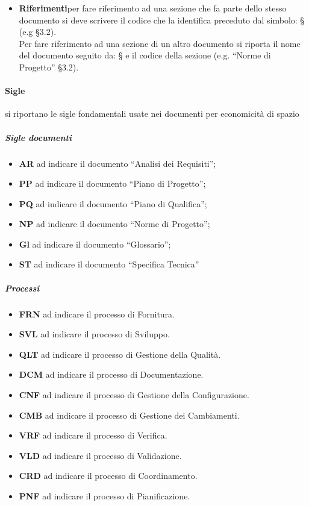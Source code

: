 \begin{itemize}
\begin{itemize}
							\item\textbf{Riferimenti}per fare riferimento ad una sezione che fa parte dello stesso documento si deve scrivere il codice che la identifica preceduto dal simbolo: § (e.g §3.2). \\
								Per fare riferimento ad una sezione di un altro documento si riporta il nome del documento seguito da: § e il codice della sezione (e.g. “Norme di Progetto” §3.2).\\
						\end{itemize}
				\end{itemize}
			\paragraph{Sigle}
				si riportano le sigle fondamentali usate nei documenti per economicità di spazio
				\subparagraph{Sigle documenti}
					\begin{itemize}
						\item\textbf{AR} ad indicare il documento “Analisi dei Requisiti”;
						\item\textbf{PP} ad indicare il documento “Piano di Progetto”;
						\item\textbf{PQ} ad indicare il documento “Piano di Qualifica”;
						\item\textbf{NP} ad indicare il documento “Norme di Progetto”;
						\item\textbf{Gl} ad indicare il documento “Glossario”;
						\item\textbf{ST} ad indicare il documento “Specifica Tecnica”
					\end{itemize}
				\subparagraph{Processi}
					\begin{itemize}
						\item\textbf{FRN} ad indicare il processo di Fornitura.
						\item\textbf{SVL} ad indicare il processo di Sviluppo.
						\item\textbf{QLT} ad indicare il processo di Gestione della Qualità.
						\item\textbf{DCM} ad indicare il processo di Documentazione.
						\item\textbf{CNF} ad indicare il processo di Gestione della Configurazione.
						\item\textbf{CMB} ad indicare il processo di Gestione dei Cambiamenti.
						\item\textbf{VRF} ad indicare il processo di Verifica.
						\item\textbf{VLD} ad indicare il processo di Validazione.
						\item\textbf{CRD} ad indicare il processo di Coordinamento.
						\item\textbf{PNF} ad indicare il processo di Pianificazione.
					\end{itemize}
